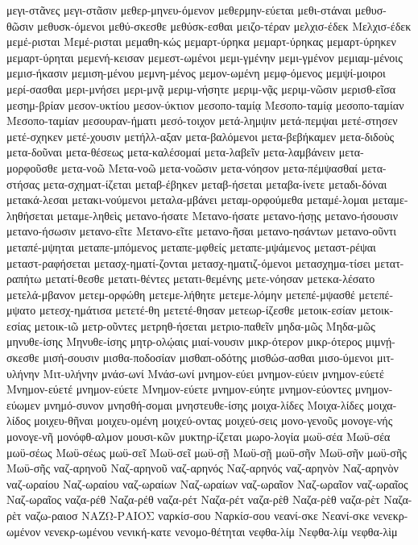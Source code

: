 {μεγι-στᾶνες
μεγι-στᾶσιν
μεθερ-μηνευ-όμενον
μεθερμην-εύεται
μεθι-στάναι
μεθυσ-θῶσιν
μεθυσκ-όμενοι
μεθύ-σκεσθε
μεθύσκ-εσθαι
μειζο-τέραν
μελχισ-έδεκ
Μελχισ-έδεκ
μεμέ-ρισται
Μεμέ-ρισται
μεμαθη-κώς
μεμαρτ-ύρηκα
μεμαρτ-ύρηκας
μεμαρτ-ύρηκεν
μεμαρτ-ύρηται
μεμενή-κεισαν
μεμεστ-ωμένοι
μεμι-γμένην
μεμι-γμένον
μεμιαμ-μένοις
μεμισ-ήκασιν
μεμιση-μένου
μεμνη-μένος
μεμον-ωμένη
μεμφ-όμενος
μεμψί-μοιροι
μερί-σασθαι
μερι-μνήσει
μερι-μνᾷ
μεριμ-νήσητε
μεριμ-νᾷς
μεριμ-νῶσιν
μερισθ-εῖσα
μεσημ-βρίαν
μεσον-υκτίου
μεσον-ύκτιον
μεσοπο-ταμίᾳ
Μεσοπο-ταμίᾳ
μεσοπο-ταμίαν
Μεσοπο-ταμίαν
μεσουραν-ήματι
μεσό-τοιχον
μετά-λημψιν
μετά-πεμψαι
μετέ-στησεν
μετέ-σχηκεν
μετέ-χουσιν
μετήλλ-αξαν
μετα-βαλόμενοι
μετα-βεβήκαμεν
μετα-διδοὺς
μετα-δοῦναι
μετα-θέσεως
μετα-καλέσομαί
μετα-λαβεῖν
μετα-λαμβάνειν
μετα-μορφοῦσθε
μετα-νοῶ
Μετα-νοῶ
μετα-νοῶσιν
μετα-νόησον
μετα-πέμψασθαί
μετα-στήσας
μετα-σχηματ-ίζεται
μεταβ-έβηκεν
μεταβ-ήσεται
μεταβα-ίνετε
μεταδι-δόναι
μετακά-λεσαι
μετακι-νούμενοι
μεταλα-μβάνει
μεταμ-ορφούμεθα
μεταμέ-λομαι
μεταμε-ληθήσεται
μεταμε-ληθεὶς
μετανο-ήσατε
Μετανο-ήσατε
μετανο-ήσῃς
μετανο-ήσουσιν
μετανο-ήσωσιν
μετανο-εῖτε
Μετανο-εῖτε
μετανο-ῆσαι
μετανο-ησάντων
μετανο-οῦντι
μεταπέ-μψηται
μεταπε-μπόμενος
μεταπε-μφθείς
μεταπε-μψάμενος
μεταστ-ρέψαι
μεταστ-ραφήσεται
μετασχ-ηματί-ζονται
μετασχ-ηματιζ-όμενοι
μετασχημα-τίσει
μετατ-ραπήτω
μετατί-θεσθε
μετατι-θέντες
μετατι-θεμένης
μετε-νόησαν
μετεκα-λέσατο
μετελά-μβανον
μετεμ-ορφώθη
μετεμε-λήθητε
μετεμε-λόμην
μετεπέ-μψασθέ
μετεπέ-μψατο
μετεσχ-ημάτισα
μετετέ-θη
μετετέ-θησαν
μετεωρ-ίζεσθε
μετοικ-εσίαν
μετοικ-εσίας
μετοικ-ιῶ
μετρ-οῦντες
μετρηθ-ήσεται
μετριο-παθεῖν
μηδα-μῶς
Μηδα-μῶς
μηνυθε-ίσης
Μηνυθε-ίσης
μητρ-ολῴαις
μιαί-νουσιν
μικρ-ότερον
μικρ-ότερος
μιμνῄ-σκεσθε
μισή-σουσιν
μισθα-ποδοσίαν
μισθαπ-οδότης
μισθώσ-ασθαι
μισο-ύμενοι
μιτ-υλήνην
Μιτ-υλήνην
μνάσ-ωνί
Μνάσ-ωνί
μνημον-εύει
μνημον-εύειν
μνημον-εύετέ
Μνημον-εύετέ
μνημον-εύετε
Μνημον-εύετε
μνημον-εύητε
μνημον-εύοντες
μνημον-εύωμεν
μνημό-συνον
μνησθή-σομαι
μνηστευθε-ίσης
μοιχα-λίδες
Μοιχα-λίδες
μοιχα-λίδος
μοιχευ-θῆναι
μοιχευ-ομένη
μοιχεύ-οντας
μοιχεύ-σεις
μονο-γενοῦς
μονογε-νής
μονογε-νῆ
μονόφθ-αλμον
μουσι-κῶν
μυκτηρ-ίζεται
μωρο-λογία
μωϋ-σέα
Μωϋ-σέα
μωϋ-σέως
Μωϋ-σέως
μωϋ-σεῖ
Μωϋ-σεῖ
μωϋ-σῇ
Μωϋ-σῇ
μωϋ-σῆν
Μωϋ-σῆν
μωϋ-σῆς
Μωϋ-σῆς
ναζ-αρηνοῦ
Ναζ-αρηνοῦ
ναζ-αρηνός
Ναζ-αρηνός
ναζ-αρηνὸν
Ναζ-αρηνὸν
ναζ-ωραίου
Ναζ-ωραίου
ναζ-ωραίων
Ναζ-ωραίων
ναζ-ωραῖον
Ναζ-ωραῖον
ναζ-ωραῖος
Ναζ-ωραῖος
ναζα-ρέθ
Ναζα-ρέθ
ναζα-ρέτ
Ναζα-ρέτ
ναζα-ρὲθ
Ναζα-ρὲθ
ναζα-ρὲτ
Ναζα-ρὲτ
ναζω-ραιοσ
ΝΑΖΩ-ΡΑΙΟΣ
ναρκίσ-σου
Ναρκίσ-σου
νεανί-σκε
Νεανί-σκε
νενεκρ-ωμένον
νενεκρ-ωμένου
νενική-κατε
νενομο-θέτηται
νεφθα-λίμ
Νεφθα-λίμ
νεφθα-λὶμ
}
